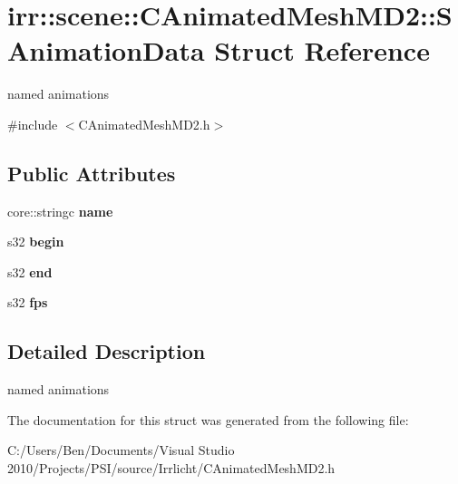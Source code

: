 \hypertarget{structirr_1_1scene_1_1_c_animated_mesh_m_d2_1_1_s_animation_data}{\section{irr\-:\-:scene\-:\-:C\-Animated\-Mesh\-M\-D2\-:\-:S\-Animation\-Data Struct Reference}
\label{structirr_1_1scene_1_1_c_animated_mesh_m_d2_1_1_s_animation_data}
}


named animations  




{\ttfamily \#include $<$C\-Animated\-Mesh\-M\-D2.\-h$>$}

\subsection*{Public Attributes}
\begin{DoxyCompactItemize}
\item 
\hypertarget{structirr_1_1scene_1_1_c_animated_mesh_m_d2_1_1_s_animation_data_ac498596ad63c92dfa498934aa2c5b2b1}{core\-::stringc {\bfseries name}}\label{structirr_1_1scene_1_1_c_animated_mesh_m_d2_1_1_s_animation_data_ac498596ad63c92dfa498934aa2c5b2b1}

\item 
\hypertarget{structirr_1_1scene_1_1_c_animated_mesh_m_d2_1_1_s_animation_data_a3783da1ef0f81fea959501bb599448e8}{s32 {\bfseries begin}}\label{structirr_1_1scene_1_1_c_animated_mesh_m_d2_1_1_s_animation_data_a3783da1ef0f81fea959501bb599448e8}

\item 
\hypertarget{structirr_1_1scene_1_1_c_animated_mesh_m_d2_1_1_s_animation_data_af15e3126a501b3045d8e38a08a7f5bb0}{s32 {\bfseries end}}\label{structirr_1_1scene_1_1_c_animated_mesh_m_d2_1_1_s_animation_data_af15e3126a501b3045d8e38a08a7f5bb0}

\item 
\hypertarget{structirr_1_1scene_1_1_c_animated_mesh_m_d2_1_1_s_animation_data_a8c7da96c16bdc20ceff3a604ec7099f0}{s32 {\bfseries fps}}\label{structirr_1_1scene_1_1_c_animated_mesh_m_d2_1_1_s_animation_data_a8c7da96c16bdc20ceff3a604ec7099f0}

\end{DoxyCompactItemize}


\subsection{Detailed Description}
named animations 

The documentation for this struct was generated from the following file\-:\begin{DoxyCompactItemize}
\item 
C\-:/\-Users/\-Ben/\-Documents/\-Visual Studio 2010/\-Projects/\-P\-S\-I/source/\-Irrlicht/C\-Animated\-Mesh\-M\-D2.\-h\end{DoxyCompactItemize}
